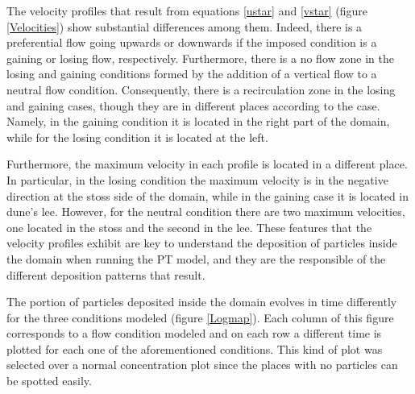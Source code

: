 \documentclass[draft,linenumbers]{agujournal2018}
\begin{document}
The velocity profiles that result from equations \ref{ustar} and \ref{vstar} (figure \ref{Velocities}) show substantial differences among them. Indeed, there is a preferential flow going upwards or downwards if the imposed condition is a gaining or losing flow, respectively. Furthermore, there is a no flow zone in the losing and gaining conditions formed by the addition of a vertical flow to a neutral flow condition. Consequently, there is a recirculation zone in the losing and gaining cases, though they are in different places according to the case. Namely, in the gaining condition it is located in the right part of the domain, while for the losing condition it is located at the left.

Furthermore, the maximum velocity in each profile is located in a different place. In particular, in the losing condition the maximum velocity is in the negative direction at the stoss side of the domain, while in the gaining case it is located in dune's lee. However, for the neutral condition there are two maximum velocities, one located in the stoss and the second in the lee. These features that the velocity profiles exhibit are key to understand the deposition of particles inside the domain when running the PT model, and they are the responsible of the different deposition patterns that result.   

The portion of particles deposited inside the domain evolves in time differently for the three conditions modeled (figure \ref{Logmap}). Each column of this figure corresponds to a flow condition modeled and on each row a different time is plotted for each one of the aforementioned conditions. This kind of plot was selected over a normal concentration plot since the places with no particles can be spotted easily. 
\end{document}
